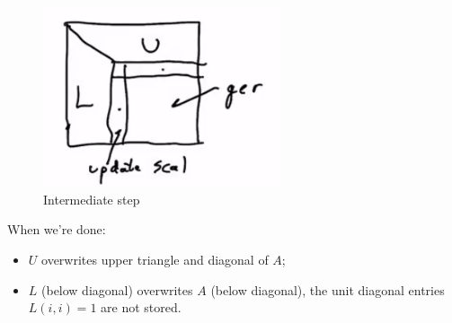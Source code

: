 \documentclass[11pt]{article}
\numberwithin{equation}{section}
\begin{document}
\begin{figure}
    \centering
    \includegraphics[width=7cm]{images/lec5-1.png}
    \caption{Intermediate step}
\end{figure}

When we're done:\begin{itemize}
    \item $U$ overwrites upper triangle and diagonal of $A$;
    \item $L$ (below diagonal) overwrites $A$ (below diagonal), the unit diagonal entries $L(i,i)=1$ are not stored.
\end{itemize}
\end{document}
